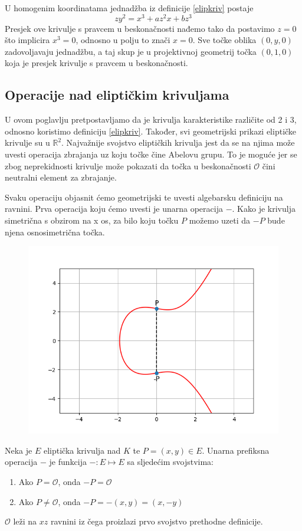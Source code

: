 \documentclass{mathos}
\begin{document}
\begin{nap}
    U homogenim koordinatama jednadžba iz definicije \ref{elipkriv} postaje
    \[ zy^2 = x^3 + az^2x + bz^3 \]
    Presjek ove krivulje s pravcem u beskonačnosti nađemo tako da postavimo $z = 0$ što implicira $x^3 = 0$, odnosno u polju to znači $x = 0$. Sve točke oblika $(0, y, 0)$ zadovoljavaju jednadžbu, a taj skup je u projektivnoj geometrij točka $(0, 1, 0)$ koja je presjek krivulje s pravcem u beskonačnosti.
\end{nap}

\subsection{Operacije nad eliptičkim krivuljama}
U ovom poglavlju pretpostavljamo da je krivulja karakteristike različite od 2 i 3, odnosno koristimo definiciju \ref{elipkriv}. Također, svi geometrijski prikazi eliptičke krivulje su u $\mathbb{R}^2$. Najvažnije svojstvo eliptičkih krivulja jest da se na njima može uvesti operacija zbrajanja uz koju točke čine Abelovu grupu. To je moguće jer se zbog neprekidnosti krivulje može pokazati da točka u beskonačnosti $\mathcal{O}$ čini neutralni element za zbrajanje.

Svaku operaciju objasnit ćemo geometrijski te uvesti algebarsku definiciju na ravnini. Prva operacija koju ćemo uvesti je unarna operacija $-$. Kako je krivulja simetrična s obzirom na x os, za bilo koju točku $P$ možemo uzeti da $-P$ bude njena osnosimetrična točka.

\begin{figure}[H]
    \centering
    \includegraphics[width=0.6\linewidth,keepaspectratio]{4.png}
\end{figure}

\begin{defin}
    Neka je $E$ eliptička krivulja nad $K$ te $P = (x, y) \in E$. Unarna prefiksna operacija $-$ je funkcija $- : E \mapsto E$ sa sljedećim svojstvima:
    \begin{enumerate}
        \item Ako $P = \mathcal{O}$, onda $-P = \mathcal{O}$
        \item Ako $P \neq \mathcal{O}$, onda $-P = -(x, y) = (x, -y)$
    \end{enumerate}
\end{defin}
\begin{nap}
    $\mathcal{O}$ leži na $xz$ ravnini iz čega proizlazi prvo svojstvo prethodne definicije.
\end{nap}
\end{document}
